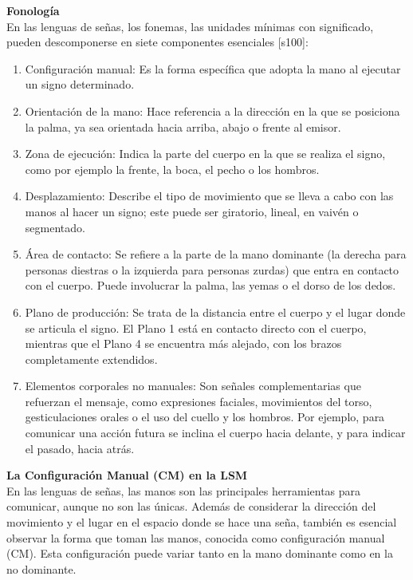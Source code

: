 \textbf{Fonología}\\
En las lenguas de señas, los fonemas, las unidades mínimas con significado, pueden descomponerse en siete componentes esenciales [s100]:

\begin{enumerate}
    \item Configuración manual: Es la forma específica que adopta la mano al ejecutar un signo determinado.
    \item Orientación de la mano: Hace referencia a la dirección en la que se posiciona la palma, ya sea orientada hacia arriba, abajo o frente al emisor.
    \item Zona de ejecución: Indica la parte del cuerpo en la que se realiza el signo, como por ejemplo la frente, la boca, el pecho o los hombros.
    \item Desplazamiento: Describe el tipo de movimiento que se lleva a cabo con las manos al hacer un signo; este puede ser giratorio, lineal, en vaivén o segmentado.
    \item Área de contacto: Se refiere a la parte de la mano dominante (la derecha para personas diestras o la izquierda para personas zurdas) que entra en contacto con el cuerpo. Puede involucrar la palma, las yemas o el dorso de los dedos.
    \item Plano de producción: Se trata de la distancia entre el cuerpo y el lugar donde se articula el signo. El Plano 1 está en contacto directo con el cuerpo, mientras que el Plano 4 se encuentra más alejado, con los brazos completamente extendidos.
    \item Elementos corporales no manuales: Son señales complementarias que refuerzan el mensaje, como expresiones faciales, movimientos del torso, gesticulaciones orales o el uso del cuello y los hombros. Por ejemplo, para comunicar una acción futura se inclina el cuerpo hacia delante, y para indicar el pasado, hacia atrás.\\
\end{enumerate}

\textbf{La Configuración Manual (CM) en la LSM}\\
En las lenguas de señas, las manos son las principales herramientas para comunicar, aunque no son las únicas. Además de considerar la dirección del movimiento y el lugar en el espacio donde se hace una seña, también es esencial observar la forma que toman las manos, conocida como configuración manual (CM). Esta configuración puede variar tanto en la mano dominante como en la no dominante.\\

